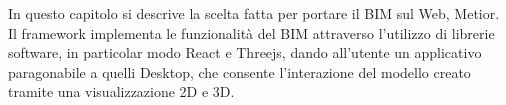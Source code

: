 In questo capitolo si descrive la scelta fatta per portare il BIM sul Web, Metior.
Il framework implementa le funzionalit\`a del BIM attraverso l'utilizzo di librerie software,
in particolar modo React e Threejs, dando all'utente un applicativo paragonabile a quelli
Desktop, che consente l'interazione del modello creato tramite una visualizzazione 2D e 3D.
